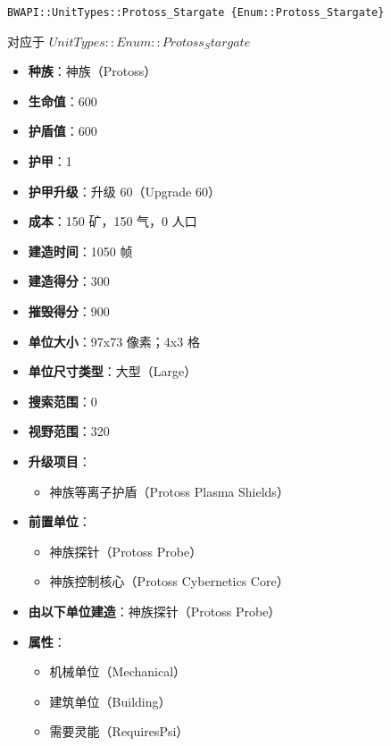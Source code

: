 \begin{tcolorbox}[colback=white, colframe=black!60!white, title=Protoss\_Stargate(), arc=0mm]
    \begin{verbatim}
BWAPI::UnitTypes::Protoss_Stargate {Enum::Protoss_Stargate}
    \end{verbatim}
    对应于  $ UnitTypes::Enum::Protoss_Stargate $ 
    \begin{itemize}
        \item \textbf{种族}：神族（Protoss）
        \item \textbf{生命值}：600
        \item \textbf{护盾值}：600
        \item \textbf{护甲}：1
        \item \textbf{护甲升级}：升级 60（Upgrade 60）
        \item \textbf{成本}：150 矿，150 气，0 人口
        \item \textbf{建造时间}：1050 帧
        \item \textbf{建造得分}：300
        \item \textbf{摧毁得分}：900
        \item \textbf{单位大小}：97x73 像素；4x3 格
        \item \textbf{单位尺寸类型}：大型（Large）
        \item \textbf{搜索范围}：0
        \item \textbf{视野范围}：320
        \item \textbf{升级项目}：
            \begin{itemize}
                \item 神族等离子护盾（Protoss Plasma Shields）
            \end{itemize}
        \item \textbf{前置单位}：
            \begin{itemize}
                \item 神族探针（Protoss Probe）
                \item 神族控制核心（Protoss Cybernetics Core）
            \end{itemize}
        \item \textbf{由以下单位建造}：神族探针（Protoss Probe）
        \item \textbf{属性}：
            \begin{itemize}
                \item 机械单位（Mechanical）
                \item 建筑单位（Building）
                \item 需要灵能（RequiresPsi）
            \end{itemize}
    \end{itemize}
\end{tcolorbox}

